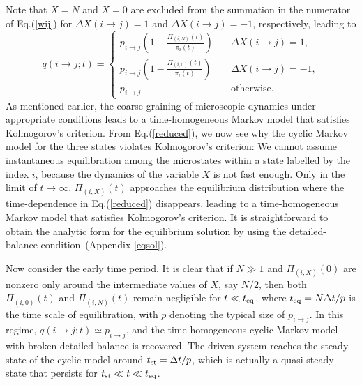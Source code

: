 \documentclass[aps,pre,amsmath,amssymb,floatfix,preprint,nofootinbib]{revtex4}
\begin{document}
 Note that $X=N$ and $X=0$ are excluded from the summation in the numerator of Eq.(\ref{wij}) for $\Delta X(i \to j) = 1$ and $\Delta X(i \to j)=-1$, respectively, leading to
\begin{equation}
	q (i \to j; t) = \left\{
	\begin{array}{ll}
		p_{i \to j}(1-\frac{\Pi_{(i,N)}(t)}{\pi_i(t)}) 	&	\quad  \Delta X(i \to j) = 1,\\
   p_{i \to j}(1-\frac{\Pi_{(i,0)}(t)}{\pi_i(t)}) 	&	\quad  \Delta X(i \to j) = -1,\\		
		p_{i \to j}	&	\quad \mathrm{otherwise}.
	\end{array}
	\right. \label{reduced}
\end{equation}
As mentioned earlier, the coarse-graining of microscopic dynamics under appropriate conditions leads to a time-homogeneous Markov model that satisfies Kolmogorov's criterion. From Eq.(\ref{reduced}), we now see why the cyclic Markov model for the three states violates Kolmogorov's criterion:  We cannot assume instantaneous equilibration among the microstates within a state labelled by the index $i$, because the dynamics of the variable $X$ is not fast enough. Only in the limit of $t \to \infty$, $\Pi_{(i,X)}(t)$ approaches the equilibrium distribution where the time-dependence in Eq.(\ref{reduced}) disappears, leading to a time-homogeneous Markov model that satisfies Kolmogorov's criterion. It is straightforward to obtain the analytic form for the equilibrium solution by using the detailed-balance condition~(Appendix \ref{eqsol}).

Now consider the early time period. It is clear that if $N \gg 1$ and $\Pi_{(i,X)}(0)$ are nonzero only around the intermediate values of $X$, say $N/2$, then both $\Pi_{(i,0)}(t)$ and $\Pi_{(i,N)}(t)$ remain negligible for $t \ll t_{\rm eq}$, where $t_{\rm eq} = N \Delta t/p$ is the time scale of equilibration, with $p$ denoting the typical size of $p_{i \to j}$. In this regime, $q(i \to j; t) \simeq p_{i \to j}$, and the time-homogeneous cyclic Markov model with broken detailed balance is recovered. The driven system reaches the steady state of the cyclic model around $t_{\rm st} = \Delta t/p$, which is actually a quasi-steady state that persists for $t_{\rm st} \ll t \ll t_{\rm eq}$. 
 
\end{document}
